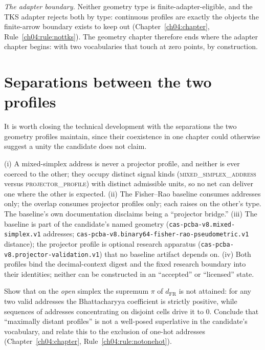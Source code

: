 \emph{The adapter boundary.} Neither geometry type is
finite-adapter-eligible, and the TKS adapter rejects both by type:
continuous profiles are exactly the objects the finite-arrow boundary
exists to keep out (Chapter~\ref{ch04:chapter},
Rule~\ref{ch04:rule:nottks}). The geometry chapter therefore ends
where the adapter chapter begins: with two vocabularies that touch at
zero points, by construction.

\section{Separations between the two profiles}\label{ch06:sec:separation}

It is worth closing the technical development with the separations the
two geometry profiles maintain, since their coexistence in one chapter
could otherwise suggest a unity the candidate does not claim.

\begin{invariant}\label{ch06:inv:separation}
(i) A mixed-simplex address is never a projector profile, and neither
is ever coerced to the other; they occupy distinct signal kinds
(\textsc{mixed\_simplex\_address} versus \textsc{projector\_profile})
with distinct admissible units, so no net can deliver one where the
other is expected.
(ii) The Fisher--Rao baseline consumes addresses only; the overlap
consumes projector profiles only; each raises on the other's type. The
baseline's own documentation disclaims being a ``projector bridge.''
(iii) The baseline is part of the candidate's named geometry
(\texttt{cas-pcba-v8.mixed-simplex.v1} addresses;
\texttt{cas-pcba-v8.binary64-fisher-rao-pseudometric.v1} distance);
the projector profile is optional research apparatus
(\texttt{cas-pcba-v8.projector-validation.v1}) that no baseline
artifact depends on.
(iv) Both profiles bind the decimal-context digest and the fixed
research boundary into their identities; neither can be constructed in
an ``accepted'' or ``licensed'' state.
\end{invariant}

\begin{exercise}
\label{ch06:ex:boundaryexercise}
Show that on the \emph{open} simplex the supremum $\pi$ of
$d_{\mathrm{FR}}$ is not attained: for any two valid addresses the
Bhattacharyya coefficient is strictly positive, while sequences of
addresses concentrating on disjoint cells drive it to $0$. Conclude
that ``maximally distant profiles'' is not a well-posed superlative in
the candidate's vocabulary, and relate this to the exclusion of one-hot
addresses (Chapter~\ref{ch04:chapter}, Rule~\ref{ch04:rule:notonehot}).
\end{exercise}

